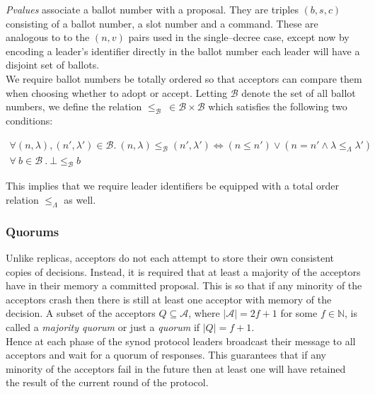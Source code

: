 \emph{Pvalues} associate a ballot number with a proposal. They are triples $\left(b, s, c \right)$ consisting of a ballot number, a slot number and a command. These are analogous to to the $\left( n, v \right)$ pairs used in the single--decree case, except now by encoding a leader's identifier directly in the ballot number each leader will have a disjoint set of ballots. \\

We require ballot numbers be totally ordered so that acceptors can compare them when choosing whether to adopt or accept. Letting $\mathcal{B}$ denote the set of all ballot numbers, we define the relation $\leq_{\mathcal{B}} \ \in \mathcal{B} \times \mathcal{B}$ which satisfies the following two conditions:

\begin{gather*}
  \forall \left( n, \lambda \right), \left( n', \lambda' \right) \in \mathcal{B} .
 \ \left( n, \lambda \right) \leq_{\mathcal{B}} \left( n', \lambda' \right) \iff
   \left ( n \leq n' \right) \vee \left( n = n' \wedge \lambda \leq_{\Lambda} \lambda' \right) \\
\forall \ b \in \mathcal{B} \ . \ \bot \leq_{\mathcal{B}} b
\end{gather*}  

This implies that we require leader identifiers be equipped with a total order relation  $\leq_{\Lambda}$ as well.

\subsubsection{Quorums}

Unlike replicas, acceptors do not each attempt to store their own consistent copies of decisions. Instead, it is required that at least a majority of the acceptors have in their memory a committed proposal. This is so that if any minority of the acceptors crash then there is still at least one acceptor with memory of the decision. A subset of the acceptors  $Q \subseteq \mathcal{A}$, where $|\mathcal{A}| = 2f + 1$ for some $f \in \mathbb{N}$, is called a \emph{majority quorum} or just a \emph{quorum} if $|Q| = f + 1$. \\

Hence at each phase of the synod protocol leaders broadcast their message to all acceptors and wait for a quorum of responses. This guarantees that if any minority of the acceptors fail in the future then at least one will have retained the result of the current round of the protocol.

